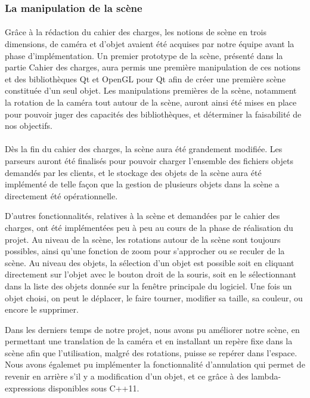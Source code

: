 \subsubsection{La manipulation de la scène}
\paragraph{}
Grâce à la rédaction du cahier des charges, les notions de scène en trois dimensions, de caméra et d'objet avaient été acquises par notre équipe avant la phase d'implémentation. Un premier prototype de la scène, présenté dans la partie Cahier des charges, aura permis une première manipulation de ces notions et des bibliothèques Qt et OpenGL pour Qt afin de créer une première scène constituée d'un seul objet. Les manipulations premières de la scène, notamment la rotation de la caméra tout autour de la scène, auront ainsi été mises en place pour pouvoir juger des capacités des bibliothèques, et déterminer la faisabilité de nos objectifs.

\paragraph{}
Dès la fin du cahier des charges, la scène aura été grandement modifiée. Les parseurs auront été finalisés pour pouvoir charger l'ensemble des fichiers objets demandés par les clients, et le stockage des objets de la scène aura été implémenté de telle façon que la gestion de plusieurs objets dans la scène a directement été opérationnelle. 

D'autres fonctionnalités, relatives à la scène et demandées par le cahier des charges, ont été implémentées peu à peu au cours de la phase de réalisation du projet. Au niveau de la scène, les rotations autour de la scène sont toujours possibles, ainsi qu'une fonction de zoom pour s'approcher ou se reculer de la scène. Au niveau des objets, la sélection d'un objet est possible soit en cliquant directement sur l'objet avec le bouton droit de la souris, soit en le sélectionnant dans la liste des objets donnée sur la fenêtre principale du logiciel. Une fois un objet choisi, on peut le déplacer, le faire tourner, modifier sa taille, sa couleur, ou encore le supprimer.

Dans les derniers temps de notre projet, nous avons pu améliorer notre scène, en permettant une translation de la caméra et en installant un repère fixe dans la scène afin que l'utilisation, malgré des rotations, puisse se repérer dans l'espace. Nous avons égalemet pu implémenter la fonctionnalité d'annulation qui permet de revenir en arrière s'il y a modification d'un objet, et ce grâce à des lambda-expressions disponibles sous C++11.

